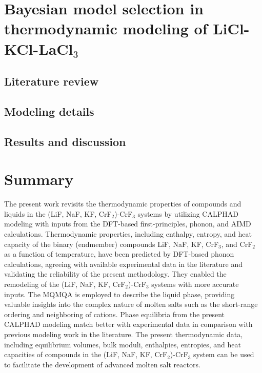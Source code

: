 \section{Bayesian model selection in thermodynamic modeling of LiCl-KCl-LaCl${_3}$} \label{moltensalts:sec:LaCl3}

\subsection{Literature review} \label{moltensalts:ssec:LaCl3lit}


\subsection{Modeling details} \label{moltensalts:ssec:LaCl3model}


    \subsection{Results and discussion} \label{moltensalts:ssec:LaCl3result}


\section{Summary} \label{moltensalts:sec:Summary}
The present work revisits the thermodynamic properties of compounds and liquids in the (LiF, NaF, KF, CrF$_2$)-CrF$_3$ systems by utilizing CALPHAD modeling with inputs from the DFT-based first-principles, phonon, and AIMD calculations. Thermodynamic properties, including enthalpy, entropy, and heat capacity of the binary (endmember) compounds LiF, NaF, KF, CrF$_3$, and CrF$_2$ as a function of temperature, have been predicted by DFT-based phonon calculations, agreeing with available experimental data in the literature and validating the reliability of the present methodology. They enabled the remodeling of the (LiF, NaF, KF, CrF$_2$)-CrF$_3$ systems with more accurate inputs. The MQMQA is employed to describe the liquid phase, providing valuable insights into the complex nature of molten salts such as the short-range ordering and neighboring of cations. Phase equilibria from the present CALPHAD modeling match better with experimental data in comparison with previous modeling work in the literature. The present thermodynamic data, including equilibrium volumes, bulk moduli, enthalpies, entropies, and heat capacities of compounds in the (LiF, NaF, KF, CrF$_2$)-CrF$_3$ system can be used to facilitate the development of advanced molten salt reactors.